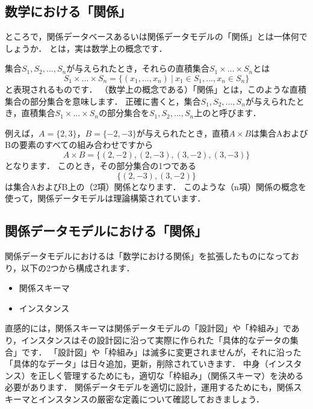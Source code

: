 \subsection{数学における「関係」}
ところで，関係データベースあるいは関係データモデルの「関係」とは一体何でしょうか．
 とは，実は数学上の概念です．

集合$S_1, S_2, ..., S_n$が与えられたとき，それらの直積集合$S_1 \times ... \times S_n$とは
\begin{equation}
S_1 \times ... \times S_n = \{(x_1, ..., x_n) \ | \ x_1 \in S_1, ..., x_n \in S_n \}
\end{equation}
と表現されるものです．
（数学上の概念である）「関係」とは，このような直積集合の部分集合を意味します．
正確に書くと，集合$S_1, S_2, ..., S_n$が与えられたとき，直積集合$S_1 \times ... \times S_n$の部分集合を$S_1, S_2, ..., S_n$上のと呼びます．

例えば，$A=\{2, 3\}$，$B=\{-2, -3\}$が与えられたとき，直積$A \times B$は集合AおよびBの要素のすべての組み合わせですから
\begin{equation}
A \times B = \{(2, -2), (2, -3), (3, -2), (3, -3)\}
\end{equation}
となります．
このとき，その部分集合の1つである
\begin{equation}
\{(2, -3), (3, -2)\}
\end{equation}
は集合AおよびB上の（2項）関係となります．
このような（n項）関係の概念を使って，関係データモデルは理論構築されています．


\subsection{関係データモデルにおける「関係」}\label{subsec:relation}
関係データモデルにおけるは「数学における関係」を拡張したものになっており，以下の2つから構成されます．
\begin{itemize}
\item 関係スキーマ
\item インスタンス
\end{itemize}
直感的には，関係スキーマは関係データモデルの「設計図」や「枠組み」であり，インスタンスはその設計図に沿って実際に作られた「具体的なデータの集合」です．
「設計図」や「枠組み」は滅多に変更されませんが，それに沿った「具体的なデータ」は日々追加，更新，削除されていきます．
中身（インスタンス）を正しく管理するためにも，適切な「枠組み」（関係スキーマ）を決める必要があります．
関係データモデルを適切に設計，運用するためにも，関係スキーマとインスタンスの厳密な定義について確認しておきましょう．

